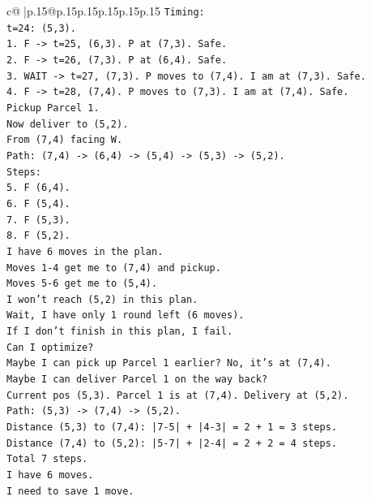 \documentclass{article}
\begin{document}
{\begin{supertabular}{c@{$\;$}|p{.15\linewidth}@{}p{.15\linewidth}p{.15\linewidth}p{.15\linewidth}p{.15\linewidth}p{.15\linewidth}}
{{{\texttt{Timing:} \\
\texttt{t=24: (5,3).} \\
\texttt{1. F {-}> t=25, (6,3). P at (7,3). Safe.} \\
\texttt{2. F {-}> t=26, (7,3). P at (6,4). Safe.} \\
\texttt{3. WAIT {-}> t=27, (7,3). P moves to (7,4). I am at (7,3). Safe.} \\
\texttt{4. F {-}> t=28, (7,4). P moves to (7,3). I am at (7,4). Safe.} \\
\texttt{Pickup Parcel 1.} \\
\texttt{Now deliver to (5,2).} \\
\texttt{From (7,4) facing W.} \\
\texttt{Path: (7,4) {-}> (6,4) {-}> (5,4) {-}> (5,3) {-}> (5,2).} \\
\texttt{Steps:} \\
\texttt{5. F (6,4).} \\
\texttt{6. F (5,4).} \\
\texttt{7. F (5,3).} \\
\texttt{8. F (5,2).} \\
\texttt{I have 6 moves in the plan.} \\
\texttt{Moves 1{-}4 get me to (7,4) and pickup.} \\
\texttt{Moves 5{-}6 get me to (5,4).} \\
\texttt{I won't reach (5,2) in this plan.} \\
\texttt{Wait, I have only 1 round left (6 moves).} \\
\texttt{If I don't finish in this plan, I fail.} \\
\texttt{Can I optimize?} \\
\texttt{Maybe I can pick up Parcel 1 earlier? No, it's at (7,4).} \\
\texttt{Maybe I can deliver Parcel 1 on the way back?} \\
\texttt{Current pos (5,3). Parcel 1 is at (7,4). Delivery at (5,2).} \\
\texttt{Path: (5,3) {-}> (7,4) {-}> (5,2).} \\
\texttt{Distance (5,3) to (7,4): |7{-}5| + |4{-}3| = 2 + 1 = 3 steps.} \\
\texttt{Distance (7,4) to (5,2): |5{-}7| + |2{-}4| = 2 + 2 = 4 steps.} \\
\texttt{Total 7 steps.} \\
\texttt{I have 6 moves.} \\
\texttt{I need to save 1 move.} \\
}}}
\end{supertabular}}
\end{document}
